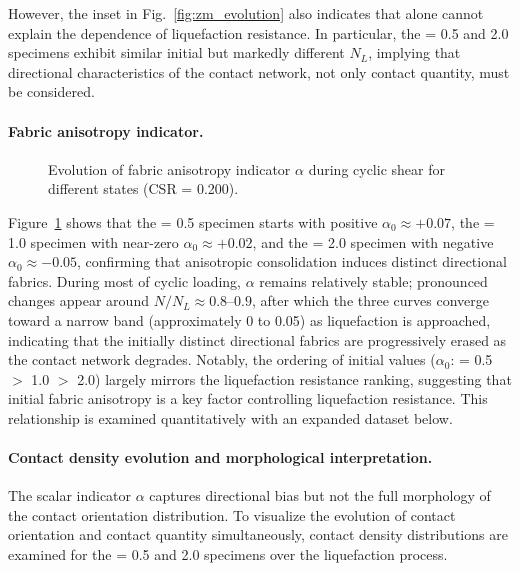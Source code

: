 However, the inset in Fig.~\ref{fig:zm_evolution} also indicates that \Zm{} alone cannot explain the \Kzero{} dependence of liquefaction resistance. In particular, the \Kzero{} = 0.5 and 2.0 specimens exhibit similar initial \Zm{} but markedly different $N_L$, implying that directional characteristics of the contact network, not only contact quantity, must be considered.

\paragraph{Fabric anisotropy indicator.}

\begin{figure}[t]
  \centering
  \caption{Evolution of fabric anisotropy indicator $\alpha$ during cyclic shear for different \Kzero{} states (CSR = 0.200).}
  \label{fig:alpha_evolution}
\end{figure}

Figure~\ref{fig:alpha_evolution} shows that the \Kzero{} = 0.5 specimen starts with positive $\alpha_0 \approx +0.07$, the \Kzero{} = 1.0 specimen with near-zero $\alpha_0 \approx +0.02$, and the \Kzero{} = 2.0 specimen with negative $\alpha_0 \approx -0.05$, confirming that anisotropic consolidation induces distinct directional fabrics. During most of cyclic loading, $\alpha$ remains relatively stable; pronounced changes appear around $N/N_L \approx 0.8$--$0.9$, after which the three curves converge toward a narrow band (approximately 0 to 0.05) as liquefaction is approached, indicating that the initially distinct directional fabrics are progressively erased as the contact network degrades. Notably, the ordering of initial values ($\alpha_0$: \Kzero{} = 0.5 $>$ 1.0 $>$ 2.0) largely mirrors the liquefaction resistance ranking, suggesting that initial fabric anisotropy is a key factor controlling liquefaction resistance. This relationship is examined quantitatively with an expanded dataset below.

\paragraph{Contact density evolution and morphological interpretation.}
The scalar indicator $\alpha$ captures directional bias but not the full morphology of the contact orientation distribution. To visualize the evolution of contact orientation and contact quantity simultaneously, contact density distributions are examined for the \Kzero{} = 0.5 and 2.0 specimens over the liquefaction process.

